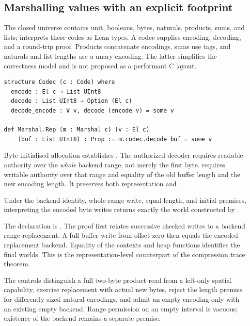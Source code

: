 \documentclass[a4paper,UKenglish,cleveref]{lipics-v2021}
\begin{document}
\subsection{Marshalling values with an explicit footprint}

The closed universe  contains unit, booleans, bytes, naturals,
products, sums, and lists;  interprets these codes as Lean types.
A codec supplies encoding, decoding, and a round-trip proof. Products concatenate
encodings, sums use tags, and naturals and list lengths use a unary encoding.
The latter simplifies the correctness model and is not proposed as a performant
C layout.

\begin{lstlisting}
structure Codec (c : Code) where
  encode : El c → List UInt8
  decode : List UInt8 → Option (El c)
  decode_encode : ∀ v, decode (encode v) = some v

def Marshal.Rep (m : Marshal c) (v : El c)
    (buf : List UInt8) : Prop := m.codec.decode buf = some v
\end{lstlisting}
Byte-initialised allocation establishes . The authorized decoder
 requires readable authority over the \emph{whole} backend range,
not merely the first byte.  requires writable authority over that
range and equality of the old buffer length and the new encoding length. It
preserves both representation and .

\begin{theorem}
Under the backend-identity, whole-range write, equal-length, and initial
 premises, interpreting the encoded byte writes returns exactly
the world constructed by .
\end{theorem}
The declaration is . The proof first relates
successive checked writes to a backend range replacement. A full-buffer write
from offset zero then equals the encoded replacement backend. Equality of the
contexts and heap functions identifies the final worlds. This is the
representation-level counterpart of the compression trace theorem.

The controls distinguish a full two-byte product read from a left-only spatial
capability, exercise replacement with actual new bytes, reject the length
premise for differently sized natural encodings, and admit an empty encoding
only with an existing empty backend. Range permission on an empty interval is
vacuous; existence of the backend remains a separate premise.
\end{document}
